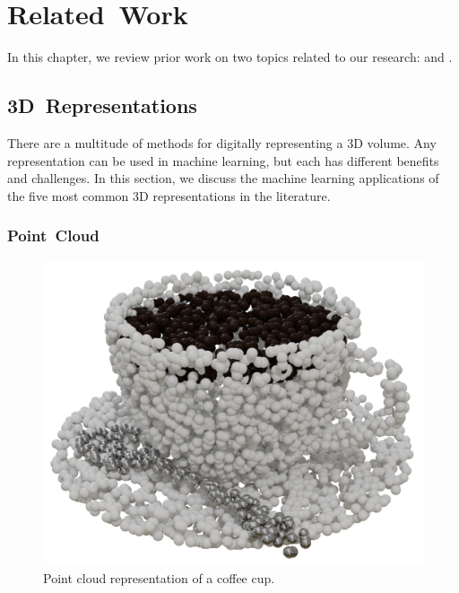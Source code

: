 
\chapter{Related~Work}
\label{chap:related_work}

In this chapter, we review prior work on two topics related to our research:  and .

\section{3D~Representations}
\label{sec:3d_representations}

There are a multitude of methods for digitally representing a 3D volume. Any representation can be used in machine learning, but each has different benefits and challenges. In this section, we discuss the machine learning applications of the five most common 3D representations in the literature.


\subsection{Point~Cloud}
\label{subsec:point_cloud}

\begin{figure}[ht]
	\centering
	\includegraphics[scale=0.2]{Images/Point Cloud Cup}
	\caption{Point cloud representation of a coffee cup.}
	\label{fig:point_cloud_cup}
\end{figure}

